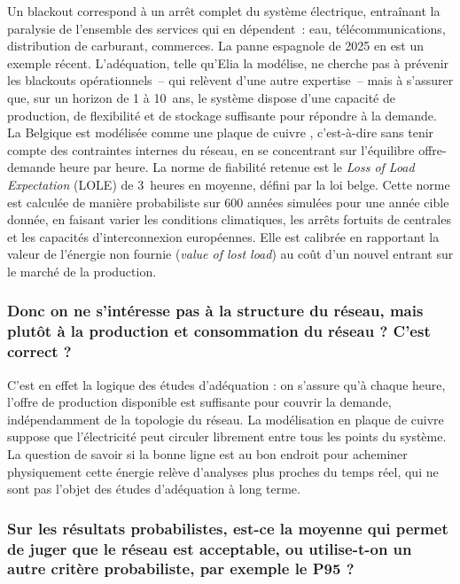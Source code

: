 Un blackout correspond à un arrêt complet du système électrique, entraînant la paralysie de l'ensemble des services qui en dépendent~: eau, télécommunications, distribution de carburant, commerces. La panne espagnole de 2025 en est un exemple récent. L'adéquation, telle qu'Elia la modélise, ne cherche pas à prévenir les blackouts opérationnels~-- qui relèvent d'une autre expertise~-- mais à s'assurer que, sur un horizon de 1 à 10~ans, le système dispose d'une capacité de production, de flexibilité et de stockage suffisante pour répondre à la demande. La Belgique est modélisée comme une \og plaque de cuivre \fg{}, c'est-à-dire sans tenir compte des contraintes internes du réseau, en se concentrant sur l'équilibre offre-demande heure par heure. La norme de fiabilité retenue est le \textit{Loss of Load Expectation} (LOLE) de 3~heures en moyenne, défini par la loi belge. Cette norme est calculée de manière probabiliste sur 600 années simulées pour une année cible donnée, en faisant varier les conditions climatiques, les arrêts fortuits de centrales et les capacités d'interconnexion européennes. Elle est calibrée en rapportant la valeur de l'énergie non fournie (\textit{value of lost load}) au coût d'un nouvel entrant sur le marché de la production.

\subsubsection{Donc on ne s'intéresse pas à la structure du réseau, mais plutôt à la production et consommation du réseau ? C'est correct ?}

C'est en effet la logique des études d'adéquation : on s'assure qu'à chaque heure, l'offre de production disponible est suffisante pour couvrir la demande, indépendamment de la topologie du réseau. La modélisation en plaque de cuivre suppose que l'électricité peut circuler librement entre tous les points du système. La question de savoir si la bonne ligne est au bon endroit pour acheminer physiquement cette énergie relève d'analyses plus proches du temps réel, qui ne sont pas l'objet des études d'adéquation à long terme.

\subsubsection{Sur les résultats probabilistes, est-ce la moyenne qui permet de juger que le réseau est acceptable, ou utilise-t-on un autre critère probabiliste, par exemple le P95 ?}

